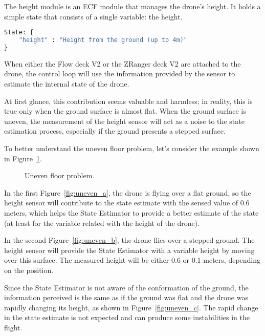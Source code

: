 The height module is an ECF module that manages the drone's height. It holds a simple state that consists of a single variable: the height.
\begin{lstlisting}[language=Python]
State: {
    "height" : "Height from the ground (up to 4m)"
}
\end{lstlisting}

When either the Flow deck V2 or the ZRanger deck V2 are attached to the drone, the control loop will use the information provided by the sensor to estimate the internal state of the drone.

At first glance, this contribution seems valuable and harmless; in reality, this is true only when the ground surface is almost flat.
When the ground surface is uneven, the measurement of the height sensor will act as a noise to the state estimation process, especially if the ground presents a stepped surface.

To better understand the uneven floor problem, let's consider the example shown in Figure~\ref{fig:uneven_floor}.

\begin{figure}[tb]
    \centering
    \quad
    \quad
    \caption{Uneven floor problem.}\label{fig:uneven_floor}
\end{figure}

In the first Figure~\ref{fig:uneven_a}, the drone is flying over a flat ground, so the height sensor will contribute to the state estimate with the sensed value of 0.6 meters, which helps the State Estimator to provide a better estimate of the state (at least for the variable related with the height of the drone).

In the second Figure~\ref{fig:uneven_b}, the drone flies over a stepped ground. 
The height sensor will provide the State Estimator with a variable height by moving over this surface. 
The measured height will be either 0.6 or 0.1 meters, depending on the position.

Since the State Estimator is not aware of the conformation of the ground, the information perceived is the same as if the ground was flat and the drone was rapidly changing its height, as shown in Figure~\ref{fig:uneven_c}. 
The rapid change in the state estimate is not expected and can produce some instabilities in the flight.

